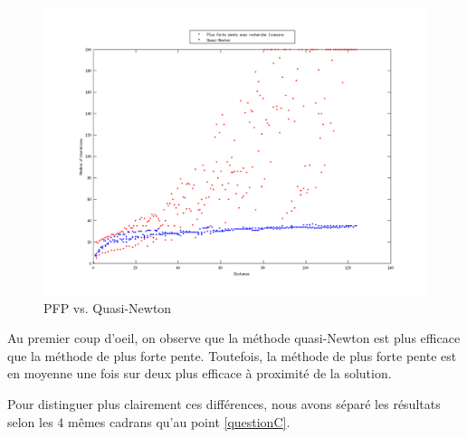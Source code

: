 \documentclass[11pt,a4paper,twoside,onecolumn,titlepage]{report}
\begin{document}
\begin{enumerate}[(a)]
\begin{figure}[h!]
	\centering
	\includegraphics[scale=0.9]{methods-allinone}
	\caption{PFP vs. Quasi-Newton}
	\label{fig:pfp-vs-qn}
\end{figure}

Au premier coup d'oeil, on observe que la méthode quasi-Newton est plus efficace que la méthode de plus forte pente. Toutefois, la méthode de plus forte pente est en moyenne une fois sur deux plus efficace à proximité de la solution.

Pour distinguer plus clairement ces différences, nous avons séparé les résultats selon les 4 mêmes cadrans qu'au point \ref{questionC}.





\end{enumerate}
\end{document}
